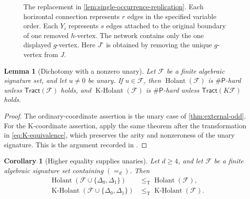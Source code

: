 \documentclass[11pt,letterpaper,onecolumn]{article}
\theoremstyle{plain}
\newtheorem{lemma}[lemma]{Lemma}
\newtheorem{corollary}[corollary]{Corollary}
\theoremstyle{definition}
\theoremstyle{remark}
\newcommand{\cF}{\mathcal F}
\newcommand{\Holant}{\operatorname{Holant}}
\newcommand{\KHolant}{\operatorname{K\text{-}Holant}}
\newcommand{\Tract}{\mathsf{Tract}}
\newcommand{\SharpP}{\#\mathsf P}
\newcommand{\Eq}{=}
\newcommand{\DeltaZero}{\Delta_0}
\newcommand{\DeltaOne}{\Delta_1}
\newcommand{\leT}{\leq_{\mathrm T}}
\begin{document}
\begin{figure}[htbp]
\centering
{}
\caption{The replacement in \cref{lem:single-occurrence-replication}.
Each horizontal connection represents \(r\) edges in the specified
variable order. Each \(Y_i\) represents \(s\) edges attached to the original
boundary of one removed \(h\)-vertex.  The network contains only the one
displayed \(g\)-vertex.  Here \(J^\circ\) is obtained by removing the
unique \(g\)-vertex from \(J\).}
\label{fig:single-occurrence-chain}
\end{figure}

	\begin{lemma}[Dichotomy with a nonzero unary]
		\label{lem:common-unary-exit}
		Let \(\cF\) be a finite algebraic signature set, and let
		\(u\ne0\) be unary.  If \(u\in\cF\), then
		\(\Holant(\cF)\) is \(\SharpP\)-hard unless \(\Tract(\cF)\) holds, and
		\(\KHolant(\cF)\) is \(\SharpP\)-hard unless \(\Tract(K\cF)\) holds.
	\end{lemma}
	
	\begin{proof}
		The ordinary-coordinate assertion is the unary case of
		\cref{thm:external-odd}.  For the K-coordinate assertion, apply the
		same theorem after the transformation in \cref{eq:K-equivalence},
		which preserves the arity and nonzeroness of the unary signature.
		This is the argument recorded in \cite[Lemma~3.4]{Liu2026DEQ2Holant}.
	\end{proof}
	
	\begin{corollary}[Higher equality supplies unaries]
		\label{cor:higher-equality-unary}
		Let \(d\ge4\), and let \(\cF\) be a finite algebraic signature set
		containing \((\Eq_d)\).  Then
		\[
		\begin{aligned}
		\Holant(\cF\cup\{\DeltaZero,\DeltaOne\})&\leT\Holant(\cF),\\
		\KHolant(\cF\cup\{\DeltaZero,\DeltaOne\})&\leT\KHolant(\cF).
		\end{aligned}
		\]
	\end{corollary}
	
\end{document}
